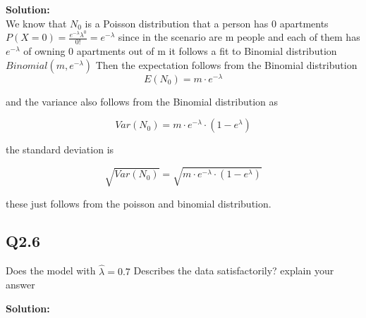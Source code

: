 \indent \textbf{Solution:} \\
We know that $N_0$ is a Poisson distribution that a person has 0 apartments $P(X=0) = \frac{e^{-\lambda} \lambda^0}{0!} = e^{-\lambda}$ 
since in the scenario are m people and each of them has $e^{-\lambda}$ of owning 0 apartments out of m
it follows a fit to Binomial distribution $Binomial(m,e^{-\lambda})$
Then the expectation follows from the Binomial distribution 
\[
    E(N_0)=m\cdot e^{-\lambda}  
\]

and the variance also follows from the Binomial distribution as

\[
    Var(N_0) = m \cdot e^{-\lambda} \cdot (1-e^{\lambda})    
\]

the standard deviation is 

\[
    \sqrt{Var(N_0)} = \sqrt{m \cdot e^{-\lambda} \cdot (1-e^{\lambda}) } 
\]

these just follows from the poisson and binomial distribution.

\subsection{Q2.6}
Does the model with $\hat{\lambda} = 0.7 $ Describes the data satisfactorily? explain 
your answer

\indent \textbf{Solution:} \\




